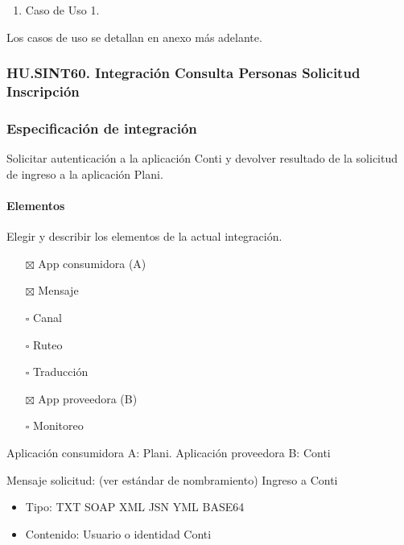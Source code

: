 \documentclass[
  paper=a4,
  ,captions=tableheading
]{scrartcl}
\providecommand{\tightlist}{%
  \setlength{\itemsep}{0pt}\setlength{\parskip}{0pt}}
\begin{document}
\begin{enumerate}
\def\labelenumi{\arabic{enumi}.}
\tightlist
\item
  Caso de Uso 1.
\end{enumerate}

Los casos de uso se detallan en anexo más adelante.

\subsubsection{HU.SINT60. Integración Consulta Personas Solicitud
Inscripción}\label{sec:hu.sint60.-integraciuxf3n-consulta-personas-solicitud-inscripciuxf3n}

\subsubsection{Especificación de
integración}\label{sec:especificaciuxf3n-de-integraciuxf3n-2}

Solicitar autenticación a la aplicación Conti y devolver resultado de la
solicitud de ingreso a la aplicación Plani.

\paragraph{Elementos}\label{sec:elementos-2}

Elegir y describir los elementos de la actual integración.

\begin{itemize}
\tightlist
\item[$\boxtimes$]
  App consumidora (A)
\item[$\boxtimes$]
  Mensaje
\item[$\square$]
  Canal
\item[$\square$]
  Ruteo
\item[$\square$]
  Traducción
\item[$\boxtimes$]
  App proveedora (B)
\item[$\square$]
  Monitoreo
\end{itemize}

Aplicación consumidora A: Plani. Aplicación proveedora B: Conti

Mensaje solicitud: (ver estándar de nombramiento) Ingreso a Conti

\begin{itemize}
\tightlist
\item
  Tipo: TXT \textbar{} SOAP \textbar{} XML \textbar{} JSN \textbar{} YML
  \textbar{} BASE64
\item
  Contenido: Usuario o identidad Conti
\end{itemize}
\end{document}
